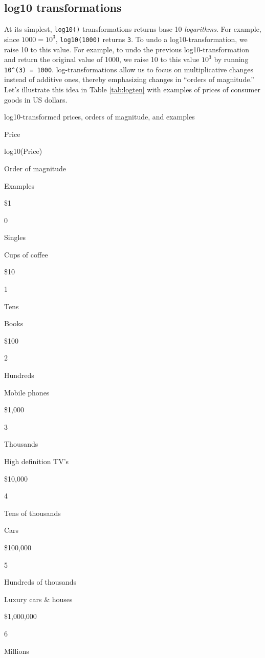 \documentclass[12pt,]{krantz}
\begin{document}
\subsection{log10 transformations}\label{log10-transformations}

At its simplest, \texttt{log10()} transformations returns base 10
\emph{logarithms}. For example, since \(1000 = 10^3\),
\texttt{log10(1000)} returns \texttt{3}. To undo a log10-transformation,
we raise 10 to this value. For example, to undo the previous
log10-transformation and return the original value of 1000, we raise 10
to this value \(10^{3}\) by running \texttt{10\^{}(3)\ =\ 1000}.
log-transformations allow us to focus on multiplicative changes instead
of additive ones, thereby emphasizing changes in ``orders of
magnitude.'' Let's illustrate this idea in Table \ref{tab:logten} with
examples of prices of consumer goods in US dollars.

\label{tab:logten}log10-transformed prices, orders of magnitude, and
examples

Price

log10(Price)

Order of magnitude

Examples

\$1

0

Singles

Cups of coffee

\$10

1

Tens

Books

\$100

2

Hundreds

Mobile phones

\$1,000

3

Thousands

High definition TV's

\$10,000

4

Tens of thousands

Cars

\$100,000

5

Hundreds of thousands

Luxury cars \& houses

\$1,000,000

6

Millions
\end{document}

